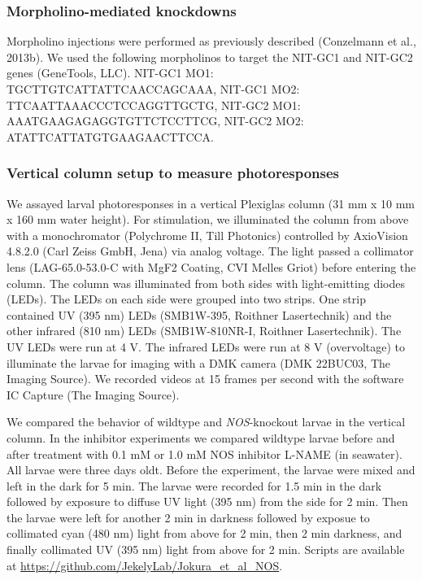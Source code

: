 \documentclass[
  11pt,
  letterpaper,
  DIV=11,
  numbers=noendperiod]{scrartcl}
\begin{document}
\subsubsection{Morpholino-mediated
knockdowns}\label{morpholino-mediated-knockdowns}

Morpholino injections were performed as previously described (Conzelmann
et al., 2013b). We used the following morpholinos to target the NIT-GC1
and NIT-GC2 genes (GeneTools, LLC). NIT-GC1 MO1:
TGCTTGTCATTATTCAACCAGCAAA, NIT-GC1 MO2: TTCAATTAAACCCTCCAGGTTGCTG,
NIT-GC2 MO1: AAATGAAGAGAGGTGTTCTCCTTCG, NIT-GC2 MO2:
ATATTCATTATGTGAAGAACTTCCA.

\subsubsection{Vertical column setup to measure
photoresponses}\label{vertical-column-setup-to-measure-photoresponses}

We assayed larval photoresponses in a vertical Plexiglas column (31 mm x
10 mm x 160 mm water height). For stimulation, we illuminated the column
from above with a monochromator (Polychrome II, Till Photonics)
controlled by AxioVision 4.8.2.0 (Carl Zeiss GmbH, Jena) via analog
voltage. The light passed a collimator lens (LAG-65.0-53.0-C with MgF2
Coating, CVI Melles Griot) before entering the column. The column was
illuminated from both sides with light-emitting diodes (LEDs). The LEDs
on each side were grouped into two strips. One strip contained UV (395
nm) LEDs (SMB1W-395, Roithner Lasertechnik) and the other infrared (810
nm) LEDs (SMB1W-810NR-I, Roithner Lasertechnik). The UV LEDs were run at
4 V. The infrared LEDs were run at 8 V (overvoltage) to illuminate the
larvae for imaging with a DMK camera (DMK 22BUC03, The Imaging Source).
We recorded videos at 15 frames per second with the software IC Capture
(The Imaging Source).

We compared the behavior of wildtype and \emph{NOS}-knockout larvae in
the vertical column. In the inhibitor experiments we compared wildtype
larvae before and after treatment with 0.1 mM or 1.0 mM NOS inhibitor
L-NAME (in seawater). All larvae were three days oldt. Before the
experiment, the larvae were mixed and left in the dark for 5 min. The
larvae were recorded for 1.5 min in the dark followed by exposure to
diffuse UV light (395 nm) from the side for 2 min. Then the larvae were
left for another 2 min in darkness followed by exposue to collimated
cyan (480 nm) light from above for 2 min, then 2 min darkness, and
finally collimated UV (395 nm) light from above for 2 min. Scripts are
available at \url{https://github.com/JekelyLab/Jokura_et_al_NOS}.
\end{document}
